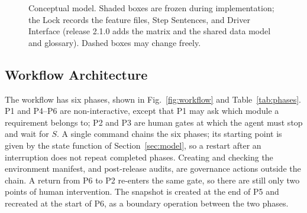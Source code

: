 \documentclass[conference]{IEEEtran}
\newcommand{\code}[1]{\texttt{#1}}
\begin{document}
\begin{figure}[t]
\caption{Conceptual model. Shaded boxes are frozen during implementation; the Lock records the feature files, Step Sentences, and Driver Interface (release 2.1.0 adds the matrix and the shared data model and glossary). Dashed boxes may change freely.}\label{fig:model}
\end{figure}

\subsection{Workflow Architecture}\label{sec:arch}

The workflow has six phases, shown in Fig.~\ref{fig:workflow} and Table~\ref{tab:phases}. P1 and P4--P6 are non-interactive, except that P1 may ask which module a requirement belongs to; P2 and P3 are human gates at which the agent must stop and wait for $S$. A single command chains the six phases; its starting point is given by the state function of Section~\ref{sec:model}, so a restart after an interruption does not repeat completed phases. Creating and checking the environment manifest, and post-release audits, are governance actions outside the chain. A return from P6 to P2 re-enters the same gate, so there are still only two points of human intervention. The snapshot is created at the end of P5 and recreated at the start of P6, as a boundary operation between the two phases.
\end{document}
